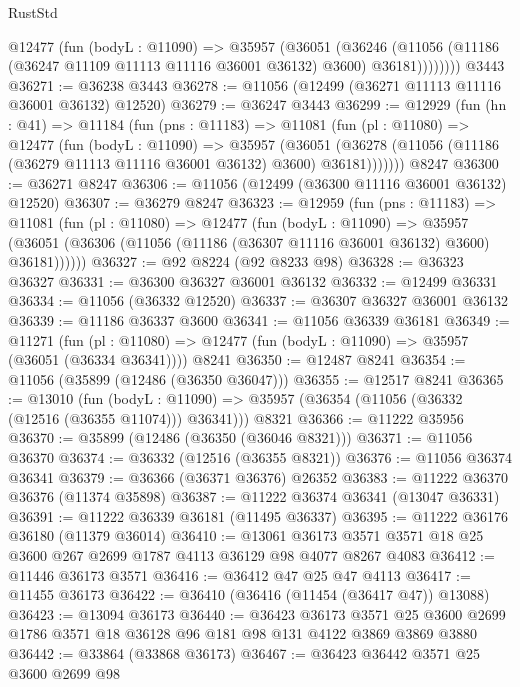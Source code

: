 \begin{lexlean}{RustStd}
\begin{coremodule}
          @12477
            (fun (bodyL : @11090) =>
            @35957
              (@36051
                (@36246
                  (@11056 (@11186 (@36247 @11109 @11113 @11116 @36001 @36132) @3600) @36181))))))))
    @3443
@36271 := @36238 @3443
@36278 := @11056 (@12499 (@36271 @11113 @11116 @36001 @36132) @12520)
@36279 := @36247 @3443
@36299 := @12929
    (fun (hn : @41) =>
    @11184
      (fun (pns : @11183) =>
      @11081
        (fun (pl : @11080) =>
        @12477
          (fun (bodyL : @11090) =>
          @35957
            (@36051
              (@36278 (@11056 (@11186 (@36279 @11113 @11116 @36001 @36132) @3600) @36181)))))))
    @8247
@36300 := @36271 @8247
@36306 := @11056 (@12499 (@36300 @11116 @36001 @36132) @12520)
@36307 := @36279 @8247
@36323 := @12959
    (fun (pns : @11183) =>
    @11081
      (fun (pl : @11080) =>
      @12477
        (fun (bodyL : @11090) =>
        @35957 (@36051 (@36306 (@11056 (@11186 (@36307 @11116 @36001 @36132) @3600) @36181))))))
@36327 := @92 @8224 (@92 @8233 @98)
@36328 := @36323 @36327
@36331 := @36300 @36327 @36001 @36132
@36332 := @12499 @36331
@36334 := @11056 (@36332 @12520)
@36337 := @36307 @36327 @36001 @36132
@36339 := @11186 @36337 @3600
@36341 := @11056 @36339 @36181
@36349 := @11271
    (fun (pl : @11080) => @12477 (fun (bodyL : @11090) => @35957 (@36051 (@36334 @36341))))
    @8241
@36350 := @12487 @8241
@36354 := @11056 (@35899 (@12486 (@36350 @36047)))
@36355 := @12517 @8241
@36365 := @13010
    (fun (bodyL : @11090) => @35957 (@36354 (@11056 (@36332 (@12516 (@36355 @11074))) @36341)))
    @8321
@36366 := @11222 @35956
@36370 := @35899 (@12486 (@36350 (@36046 @8321)))
@36371 := @11056 @36370
@36374 := @36332 (@12516 (@36355 @8321))
@36376 := @11056 @36374 @36341
@36379 := @36366 (@36371 @36376) @26352
@36383 := @11222 @36370 @36376 (@11374 @35898)
@36387 := @11222 @36374 @36341 (@13047 @36331)
@36391 := @11222 @36339 @36181 (@11495 @36337)
@36395 := @11222 @36176 @36180 (@11379 @36014)
@36410 := @13061
    @36173
    @3571
    @3571
    @18
    @25
    @3600
    @267
    @2699
    @1787
    @4113
    @36129
    @98
    @4077
    @8267
    @4083
@36412 := @11446 @36173 @3571
@36416 := @36412 @47 @25 @47 @4113
@36417 := @11455 @36173
@36422 := @36410 (@36416 (@11454 (@36417 @47)) @13088)
@36423 := @13094 @36173
@36440 := @36423
    @36173
    @3571
    @25
    @3600
    @2699
    @1786
    @3571
    @18
    @36128
    @96
    @181
    @98
    @131
    @4122
    @3869
    @3869
    @3880
@36442 := @33864 (@33868 @36173)
@36467 := @36423
    @36442
    @3571
    @25
    @3600
    @2699
    @98

\end{coremodule}
\end{lexlean}
